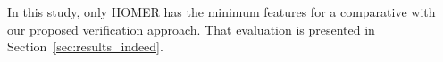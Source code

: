 \documentclass[review]{elsarticle}
\begin{document}
%
In this study, only HOMER has the minimum features for a comparative with our proposed verification approach. That evaluation is presented in Section~\ref{sec:results_indeed}.%
%
\end{document}

